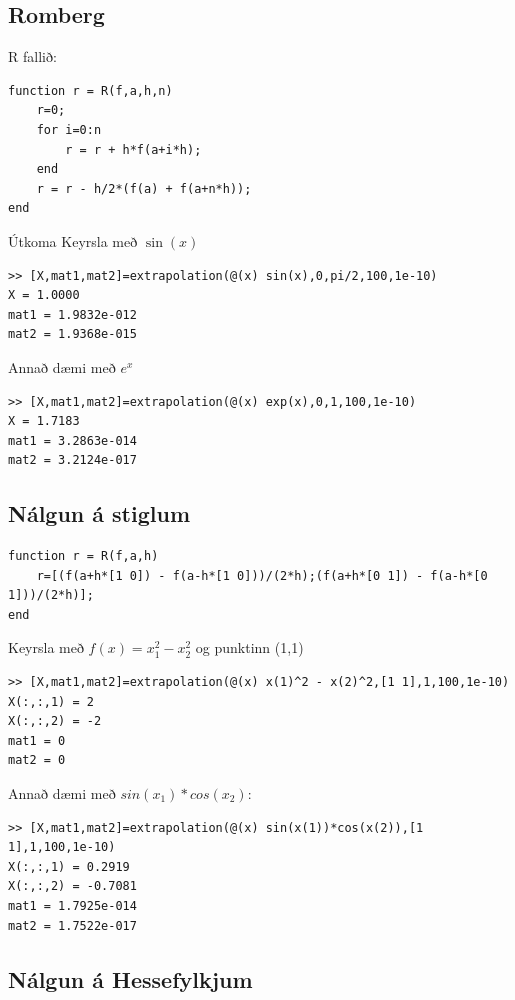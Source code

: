 \documentclass[a4]{article}
\begin{document}
\subsection{Romberg}
R fallið:
\begin{lstlisting}
function r = R(f,a,h,n)
    r=0;
    for i=0:n
        r = r + h*f(a+i*h);
    end
    r = r - h/2*(f(a) + f(a+n*h));
end
\end{lstlisting}
Útkoma
Keyrsla með $\sin(x)$
\begin{lstlisting}
>> [X,mat1,mat2]=extrapolation(@(x) sin(x),0,pi/2,100,1e-10)
X = 1.0000
mat1 = 1.9832e-012
mat2 = 1.9368e-015
\end{lstlisting}  
Annað dæmi með $e^x$
\begin{lstlisting}
>> [X,mat1,mat2]=extrapolation(@(x) exp(x),0,1,100,1e-10)
X = 1.7183
mat1 = 3.2863e-014
mat2 = 3.2124e-017
\end{lstlisting}

\subsection{Nálgun á stiglum}
\begin{lstlisting}
function r = R(f,a,h)
    r=[(f(a+h*[1 0]) - f(a-h*[1 0]))/(2*h);(f(a+h*[0 1]) - f(a-h*[0 1]))/(2*h)];
end
\end{lstlisting}

Keyrsla með $f(x) = x^2_1 - x^2_2$ og punktinn (1,1)
\begin{lstlisting}
>> [X,mat1,mat2]=extrapolation(@(x) x(1)^2 - x(2)^2,[1 1],1,100,1e-10)
X(:,:,1) = 2
X(:,:,2) = -2
mat1 = 0
mat2 = 0
\end{lstlisting}

Annað dæmi með $sin(x_1)*cos(x_2)$:
\begin{lstlisting}
>> [X,mat1,mat2]=extrapolation(@(x) sin(x(1))*cos(x(2)),[1 1],1,100,1e-10)
X(:,:,1) = 0.2919
X(:,:,2) = -0.7081
mat1 = 1.7925e-014
mat2 = 1.7522e-017 
\end{lstlisting}

\subsection{Nálgun á Hessefylkjum}
\end{document}
